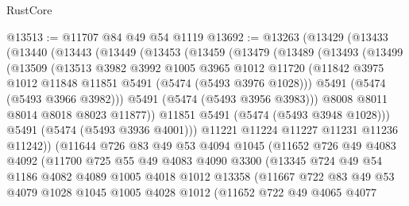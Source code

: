 \begin{lexlean}{RustCore}
\begin{coremodule}
@13513 := @11707 @84 @49 @54 @1119
@13692 := @13263
    (@13429
      (@13433
        (@13440
          (@13443
            (@13449
              (@13453
                (@13459
                  (@13479
                    (@13489
                      (@13493
                        (@13499
                          (@13509
                            (@13513
                              @3982
                              @3992
                              @1005
                              @3965
                              @1012
                              @11720
                              (@11842 @3975 @1012 @11848 @11851 @5491 (@5474 (@5493 @3976 @1028)))
                              @5491
                              (@5474 (@5493 @3966 @3982)))
                            @5491
                            (@5474 (@5493 @3956 @3983)))
                          @8008
                          @8011
                          @8014
                          @8018
                          @8023
                          @11877))
                      @11851
                      @5491
                      (@5474 (@5493 @3948 @1028)))
                    @5491
                    (@5474 (@5493 @3936 @4001)))
                  @11221
                  @11224
                  @11227
                  @11231
                  @11236
                  @11242))
              (@11644
                @726
                @83
                @49
                @53
                @4094
                @1045
                (@11652
                  @726
                  @49
                  @4083
                  @4092
                  (@11700
                    @725
                    @55
                    @49
                    @4083
                    @4090
                    @3300
                    (@13345
                      @724
                      @49
                      @54
                      @1186
                      @4082
                      @4089
                      @1005
                      @4018
                      @1012
                      @13358
                      (@11667
                        @722
                        @83
                        @49
                        @53
                        @4079
                        @1028
                        @1045
                        @1005
                        @4028
                        @1012
                        (@11652
                          @722
                          @49
                          @4065
                          @4077

\end{coremodule}
\end{lexlean}
